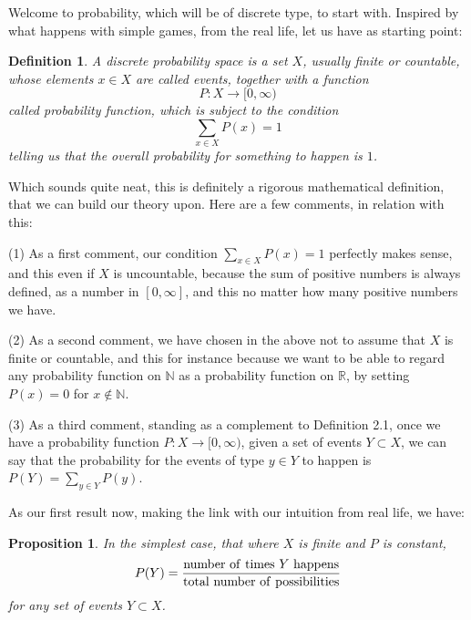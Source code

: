 \documentclass[12pt]{amsbook}
\newtheorem{definition}[theorem]{Definition}
\newtheorem{proposition}[theorem]{Proposition}
\begin{document}
Welcome to probability, which will be of discrete type, to start with. Inspired by what happens with simple games, from the real life, let us have as starting point:


\begin{definition}
A discrete probability space is a set $X$, usually finite or countable, whose elements $x\in X$ are called events, together with a function
$$P:X\to[0,\infty)$$
called probability function, which is subject to the condition
$$\sum_{x\in X}P(x)=1$$
telling us that the overall probability for something to happen is $1$.
\end{definition}

Which sounds quite neat, this is definitely a rigorous mathematical definition, that we can build our theory upon. Here are a few comments, in relation with this:

\bigskip

(1) As a first comment, our condition $\sum_{x\in X}P(x)=1$ perfectly makes sense, and this even if $X$ is uncountable, because the sum of positive numbers is always defined, as a number in $[0,\infty]$, and this no matter how many positive numbers we have.

\bigskip

(2) As a second comment, we have chosen in the above not to assume that $X$ is finite or countable, and this for instance because we want to be able to regard any probability function on $\mathbb N$ as a probability function on $\mathbb R$, by setting $P(x)=0$ for $x\notin\mathbb N$. 

\bigskip

(3) As a third comment, standing as a complement to Definition 2.1, once we have a probability function $P:X\to[0,\infty)$, given a  set of events $Y\subset X$, we can say that the probability for the events of type $y\in Y$ to happen is $P(Y)=\sum_{y\in Y}P(y)$.

\bigskip

As our first result now, making the link with our intuition from real life, we have:

\begin{proposition}
In the simplest case, that where $X$ is finite and $P$ is constant,
$$P(Y)=\frac{{\rm number\ of\ times}\ Y\ {\rm happens}}{{\rm total\ number\ of\ possibilities}}$$
for any set of events $Y\subset X$.
\end{proposition}
\end{document}
